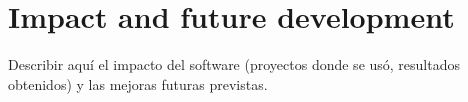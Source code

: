 \section{Impact and future development}
\label{sec:impacto}

Describir aquí el impacto del software (proyectos donde se usó, resultados obtenidos) y las mejoras futuras previstas.
